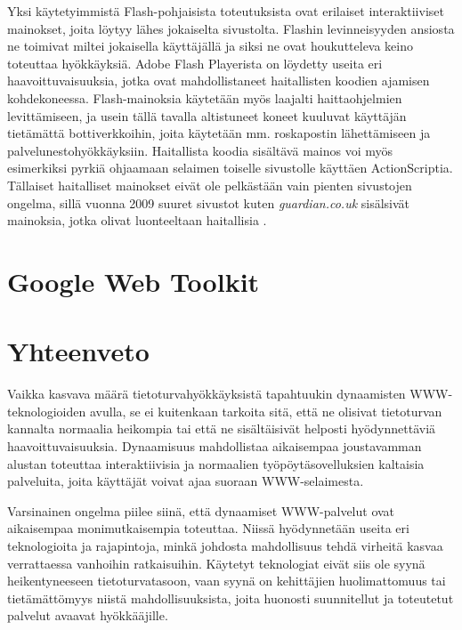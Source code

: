 Yksi käytetyimmistä Flash-pohjaisista toteutuksista ovat erilaiset
interaktiiviset mainokset, joita löytyy lähes jokaiselta
sivustolta. Flashin levinneisyyden ansiosta ne toimivat miltei
jokaisella käyttäjällä ja siksi ne ovat houkutteleva keino toteuttaa
hyökkäyksiä. Adobe Flash Playerista on löydetty useita eri
haavoittuvaisuuksia, jotka ovat mahdollistaneet haitallisten koodien
ajamisen kohdekoneessa. Flash-mainoksia käytetään myös laajalti
haittaohjelmien levittämiseen, ja usein tällä tavalla altistuneet
koneet kuuluvat käyttäjän tietämättä bottiverkkoihin, joita käytetään
mm. roskapostin lähettämiseen ja palvelunestohyökkäyksiin. Haitallista
koodia sisältävä mainos voi myös esimerkiksi pyrkiä ohjaamaan selaimen
toiselle sivustolle käyttäen ActionScriptia.  Tällaiset haitalliset
mainokset eivät ole pelkästään vain pienten sivustojen ongelma, sillä
vuonna 2009 suuret sivustot kuten \emph{guardian.co.uk} sisälsivät
mainoksia, jotka olivat luonteeltaan haitallisia \cite{FlashAdd}.

\ifdefined\seminaari \relax \else %
\section{Google Web Toolkit}




\fi

\section{Yhteenveto}

Vaikka kasvava määrä tietoturvahyökkäyksistä tapahtuukin dynaamisten
WWW-teknologioiden avulla, se ei kuitenkaan tarkoita sitä, että ne
olisivat tietoturvan kannalta normaalia heikompia tai että ne
sisältäisivät helposti hyödynnettäviä haavoittuvaisuuksia. Dynaamisuus
mahdollistaa aikaisempaa joustavamman alustan toteuttaa
interaktiivisia ja normaalien työpöytäsovelluksien kaltaisia
palveluita, joita käyttäjät voivat ajaa suoraan
WWW-selaimesta.

Varsinainen ongelma piilee siinä, että dynaamiset WWW-palvelut ovat
aikaisempaa monimutkaisempia toteuttaa. Niissä hyödynnetään useita eri
teknologioita ja rajapintoja, minkä johdosta mahdollisuus tehdä
virheitä kasvaa verrattaessa vanhoihin ratkaisuihin. Käytetyt
teknologiat eivät siis ole syynä heikentyneeseen tietoturvatasoon,
vaan syynä on kehittäjien huolimattomuus tai tietämättömyys niistä
mahdollisuuksista, joita huonosti suunnitellut ja toteutetut palvelut
avaavat hyökkääjille.
